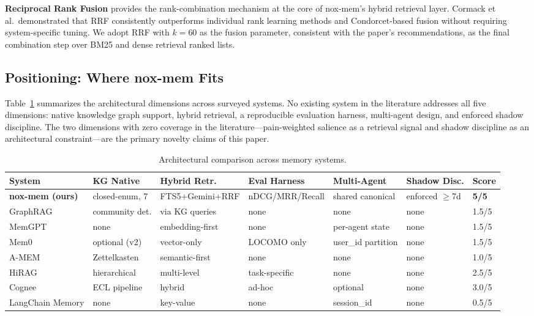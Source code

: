 \documentclass{article}
\begin{document}
\textbf{Reciprocal Rank Fusion} \cite{cormack2009rrf} provides the rank-combination
mechanism at the core of nox-mem's hybrid retrieval layer. Cormack et al.\ demonstrated
that RRF consistently outperforms individual rank learning methods and Condorcet-based
fusion without requiring system-specific tuning. We adopt RRF with $k=60$ as the fusion
parameter, consistent with the paper's recommendations, as the final combination step over
BM25 and dense retrieval ranked lists.

\subsection{Positioning: Where nox-mem Fits}

Table~\ref{tab:comparison} summarizes the architectural dimensions across surveyed systems.
No existing system in the literature addresses all five dimensions: native knowledge graph
support, hybrid retrieval, a reproducible evaluation harness, multi-agent design, and
enforced shadow discipline. The two dimensions with zero coverage in the literature---pain-weighted
salience as a retrieval signal and shadow discipline as an architectural constraint---are
the primary novelty claims of this paper.

\begin{table}[t]
  \caption{Architectural comparison across memory systems.}
  \label{tab:comparison}
  \centering
  \small
  \begin{tabular}{lllllll}
    \toprule
    System & KG Native & Hybrid Retr. & Eval Harness & Multi-Agent & Shadow Disc. & Score \\
    \midrule
    \textbf{nox-mem (ours)} & closed-enum, 7 & FTS5+Gemini+RRF & nDCG/MRR/Recall & shared canonical & enforced $\geq$7d & \textbf{5/5} \\
    GraphRAG \cite{edge2024graphrag} & community det. & via KG queries & none & none & none & 1.5/5 \\
    MemGPT \cite{packer2023memgpt} & none & embedding-first & none & per-agent state & none & 1.5/5 \\
    Mem0 \cite{chhikara2025mem0} & optional (v2) & vector-only & LOCOMO only & user\_id partition & none & 1.5/5 \\
    A-MEM \cite{xu2025amem} & Zettelkasten & semantic-first & none & none & none & 1.0/5 \\
    HiRAG \cite{huang2025hirag} & hierarchical & multi-level & task-specific & none & none & 2.5/5 \\
    Cognee \cite{topoteretes2024cognee} & ECL pipeline & hybrid & ad-hoc & optional & none & 3.0/5 \\
    LangChain Memory & none & key-value & none & session\_id & none & 0.5/5 \\
    \bottomrule
  \end{tabular}
\end{table}
\end{document}
